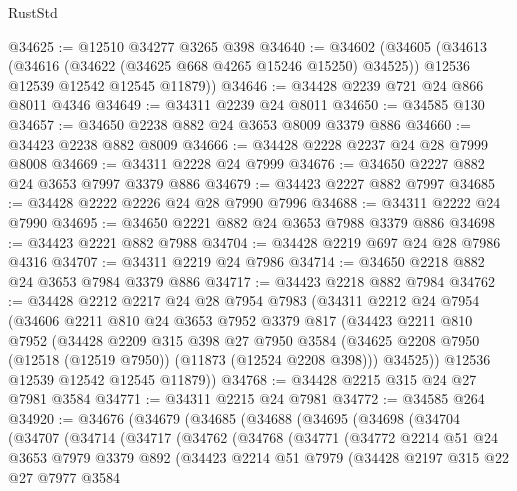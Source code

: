 \begin{lexlean}{RustStd}
\begin{coremodule}
@34625 := @12510 @34277 @3265 @398
@34640 := @34602
    (@34605
      (@34613
        (@34616 (@34622 (@34625 @668 @4265 @15246 @15250) @34525))
        @12536
        @12539
        @12542
        @12545
        @11879))
@34646 := @34428 @2239 @721 @24 @866 @8011 @4346
@34649 := @34311 @2239 @24 @8011
@34650 := @34585 @130
@34657 := @34650 @2238 @882 @24 @3653 @8009 @3379 @886
@34660 := @34423 @2238 @882 @8009
@34666 := @34428 @2228 @2237 @24 @28 @7999 @8008
@34669 := @34311 @2228 @24 @7999
@34676 := @34650 @2227 @882 @24 @3653 @7997 @3379 @886
@34679 := @34423 @2227 @882 @7997
@34685 := @34428 @2222 @2226 @24 @28 @7990 @7996
@34688 := @34311 @2222 @24 @7990
@34695 := @34650 @2221 @882 @24 @3653 @7988 @3379 @886
@34698 := @34423 @2221 @882 @7988
@34704 := @34428 @2219 @697 @24 @28 @7986 @4316
@34707 := @34311 @2219 @24 @7986
@34714 := @34650 @2218 @882 @24 @3653 @7984 @3379 @886
@34717 := @34423 @2218 @882 @7984
@34762 := @34428
    @2212
    @2217
    @24
    @28
    @7954
    @7983
    (@34311
      @2212
      @24
      @7954
      (@34606
        @2211
        @810
        @24
        @3653
        @7952
        @3379
        @817
        (@34423
          @2211
          @810
          @7952
          (@34428
            @2209
            @315
            @398
            @27
            @7950
            @3584
            (@34625 @2208 @7950 (@12518 (@12519 @7950)) (@11873 (@12524 @2208 @398)))
            @34525))
        @12536
        @12539
        @12542
        @12545
        @11879))
@34768 := @34428 @2215 @315 @24 @27 @7981 @3584
@34771 := @34311 @2215 @24 @7981
@34772 := @34585 @264
@34920 := @34676
    (@34679
      (@34685
        (@34688
          (@34695
            (@34698
              (@34704
                (@34707
                  (@34714
                    (@34717
                      (@34762
                        (@34768
                          (@34771
                            (@34772
                              @2214
                              @51
                              @24
                              @3653
                              @7979
                              @3379
                              @892
                              (@34423
                                @2214
                                @51
                                @7979
                                (@34428
                                  @2197
                                  @315
                                  @22
                                  @27
                                  @7977
                                  @3584

\end{coremodule}
\end{lexlean}

